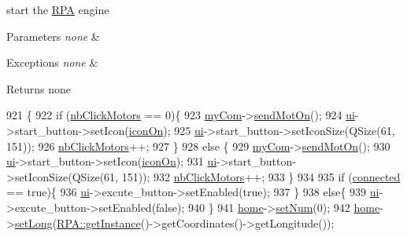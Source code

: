 start the \hyperlink{a00012}{R\-P\-A} engine 


\begin{DoxyParams}{Parameters}
{\em none} & \\
\hline
\end{DoxyParams}

\begin{DoxyExceptions}{Exceptions}
{\em none} & \\
\hline
\end{DoxyExceptions}
\begin{DoxyReturn}{Returns}
none 
\end{DoxyReturn}

\begin{DoxyCode}
921                        \{
922     \textcolor{keywordflow}{if} (\hyperlink{a00008_a3e763e8c98add9ad72c168941a42c3da}{nbClickMotors} == 0)\{
923             \hyperlink{a00008_a92b8cb43df3f03b62d33cd4e04550941}{myCom}->\hyperlink{a00002_ad6b67904e4b30f5a26bef654f8a3c4a6}{sendMotOn}();
924             \hyperlink{a00008_a6dc041ef6a2ffb329928d2913e8344e6}{ui}->start\_button->setIcon(\hyperlink{a00008_afa3cdab37d8290f081abb0c5fb137230}{iconOn});
925             \hyperlink{a00008_a6dc041ef6a2ffb329928d2913e8344e6}{ui}->start\_button->setIconSize(QSize(61, 151));
926             \hyperlink{a00008_a3e763e8c98add9ad72c168941a42c3da}{nbClickMotors}++;
927       \}
928     \textcolor{keywordflow}{else} \{
929             \hyperlink{a00008_a92b8cb43df3f03b62d33cd4e04550941}{myCom}->\hyperlink{a00002_ad6b67904e4b30f5a26bef654f8a3c4a6}{sendMotOn}();
930             \hyperlink{a00008_a6dc041ef6a2ffb329928d2913e8344e6}{ui}->start\_button->setIcon(\hyperlink{a00008_afa3cdab37d8290f081abb0c5fb137230}{iconOn});
931             \hyperlink{a00008_a6dc041ef6a2ffb329928d2913e8344e6}{ui}->start\_button->setIconSize(QSize(61, 151));
932             \hyperlink{a00008_a3e763e8c98add9ad72c168941a42c3da}{nbClickMotors}++;
933         \}
934 
935     \textcolor{keywordflow}{if} (\hyperlink{a00008_ab36823025f12a809217f7771125658c2}{connected} == \textcolor{keyword}{true})\{
936         \hyperlink{a00008_a6dc041ef6a2ffb329928d2913e8344e6}{ui}->excute\_button->setEnabled(\textcolor{keyword}{true});
937     \}
938     \textcolor{keywordflow}{else}\{
939         \hyperlink{a00008_a6dc041ef6a2ffb329928d2913e8344e6}{ui}->excute\_button->setEnabled(\textcolor{keyword}{false});
940     \}
941     \hyperlink{a00008_aff3d8bd7b2da805cc51487a7b3f7b6dd}{home}->\hyperlink{a00016_a14c494edc171ceb9b2934855efa3d994}{setNum}(0);
942     \hyperlink{a00008_aff3d8bd7b2da805cc51487a7b3f7b6dd}{home}->\hyperlink{a00016_aaa12873d55502d21104ba3e24f6588c2}{setLong}(\hyperlink{a00012_a40277d38c94caf6125045994ba06f18f}{RPA::getInstance}()->getCoordinates()->getLongitude());

\end{DoxyCode}
